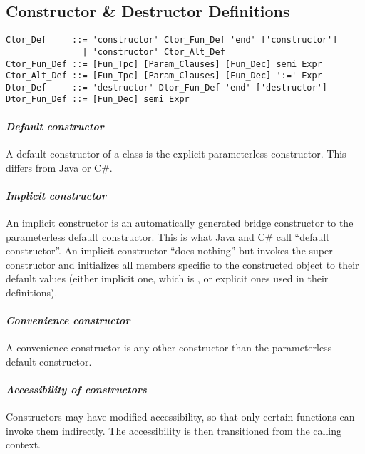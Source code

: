 \subsection{Constructor \& Destructor Definitions}
\label{sec:constructor-destructor-def}

\syntax\begin{lstlisting}
Ctor_Def     ::= 'constructor' Ctor_Fun_Def 'end' ['constructor']
               | 'constructor' Ctor_Alt_Def
Ctor_Fun_Def ::= [Fun_Tpc] [Param_Clauses] [Fun_Dec] semi Expr
Ctor_Alt_Def ::= [Fun_Tpc] [Param_Clauses] [Fun_Dec] ':=' Expr
Dtor_Def     ::= 'destructor' Dtor_Fun_Def 'end' ['destructor']
Dtor_Fun_Def ::= [Fun_Dec] semi Expr
\end{lstlisting}


\paragraph{\em Default constructor}
A default constructor of a class is the explicit parameterless constructor. This differs from Java or C\#. 

\paragraph{\em Implicit constructor}
An implicit constructor is an automatically generated bridge constructor to the parameterless default constructor. This is what Java and C\# call ``default constructor''. An implicit constructor ``does nothing'' but invokes the super-constructor and initializes all members specific to the constructed object to their default values (either implicit one, which is , or explicit ones used in their definitions). 

\paragraph{\em Convenience constructor}
A convenience constructor is any other constructor than the parameterless default constructor. 

\paragraph{\em Accessibility of constructors}
Constructors may have modified accessibility, so that only certain functions can invoke them indirectly. The accessibility is then transitioned from the calling context. 

